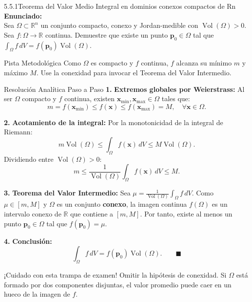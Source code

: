 \documentclass[11pt,a4paper]{article}
\begin{document}
\begin{nivelbox}{5.5.1}{Teorema del Valor Medio Integral en dominios conexos compactos de Rn}
\textbf{Enunciado:}\\
Sea $\Omega \subset \mathbb{R}^n$ un conjunto compacto, conexo y Jordan-medible con $\operatorname{Vol}(\Omega) > 0$. Sea $f: \Omega \to \mathbb{R}$ continua. Demuestre que existe un punto $\mathbf{p}_0 \in \Omega$ tal que $\int_\Omega f \, dV = f(\mathbf{p}_0) \operatorname{Vol}(\Omega)$.

\begin{observacionbox}{Pista Metodológica}
Como $\Omega$ es compacto y $f$ continua, $f$ alcanza su mínimo $m$ y máximo $M$. Use la conexidad para invocar el Teorema del Valor Intermedio.
\end{observacionbox}

\begin{ejerciciobox}{Resolución Analítica Paso a Paso}
\smallskip\noindent\textbf{1.} \textbf{Extremos globales por Weierstrass:}
Al ser $\Omega$ compacto y $f$ continua, existen $\mathbf{x}_{\min}, \mathbf{x}_{\max} \in \Omega$ tales que:
\[m = f(\mathbf{x}_{\min}) \le f(\mathbf{x}) \le f(\mathbf{x}_{\max}) = M, \quad \forall \mathbf{x} \in \Omega.\]

\smallskip\noindent\textbf{2.} \textbf{Acotamiento de la integral:}
Por la monotonicidad de la integral de Riemann:
\[m \operatorname{Vol}(\Omega) \le \int_\Omega f(\mathbf{x}) \, dV \le M \operatorname{Vol}(\Omega).\]
Dividiendo entre $\operatorname{Vol}(\Omega) > 0$:
\[m \le \frac{1}{\operatorname{Vol}(\Omega)} \int_\Omega f(\mathbf{x}) \, dV \le M.\]

\smallskip\noindent\textbf{3.} \textbf{Teorema del Valor Intermedio:}
Sea $\mu = \frac{1}{\operatorname{Vol}(\Omega)} \int_\Omega f \, dV$. Como $\mu \in [m, M]$ y $\Omega$ es un conjunto \textbf{conexo}, la imagen continua $f(\Omega)$ es un intervalo conexo de $\mathbb{R}$ que contiene a $[m, M]$.
Por tanto, existe al menos un punto $\mathbf{p}_0 \in \Omega$ tal que $f(\mathbf{p}_0) = \mu$.

\smallskip\noindent\textbf{4.} \textbf{Conclusión:}
\[\int_\Omega f \, dV = f(\mathbf{p}_0) \operatorname{Vol}(\Omega). \qquad \blacksquare\]
\end{ejerciciobox}

\begin{errorbox}{¡Cuidado con esta trampa de examen!}
Omitir la hipótesis de conexidad. Si $\Omega$ está formado por dos componentes disjuntas, el valor promedio puede caer en un hueco de la imagen de $f$.
\end{errorbox}
\end{nivelbox}
\bigskip
\end{document}
